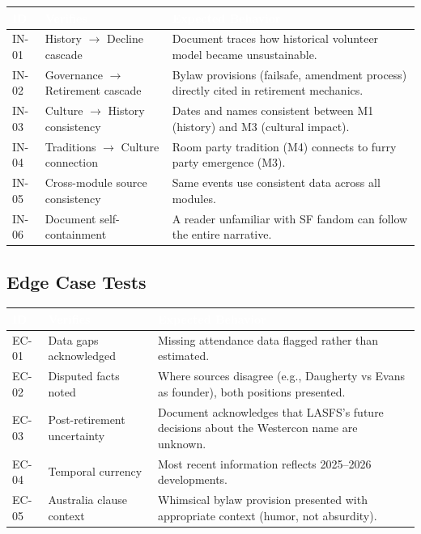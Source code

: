 \documentclass[11pt,letterpaper]{article}
\newcommand{\tableheader}[1]{\textbf{\sffamily\textcolor{white}{#1}}}
\begin{document}
\begin{center}
\begin{tabularx}{\textwidth}{C{1.2cm}L{3cm}X}
\toprule
{}
\tableheader{ID} & \tableheader{Verifies} & \tableheader{Expected Behavior} \\
\midrule
IN-01 & History $\rightarrow$ Decline cascade & Document traces how historical volunteer model became unsustainable. \\
IN-02 & Governance $\rightarrow$ Retirement cascade & Bylaw provisions (failsafe, amendment process) directly cited in retirement mechanics. \\
IN-03 & Culture $\rightarrow$ History consistency & Dates and names consistent between M1 (history) and M3 (cultural impact). \\
IN-04 & Traditions $\rightarrow$ Culture connection & Room party tradition (M4) connects to furry party emergence (M3). \\
IN-05 & Cross-module source consistency & Same events use consistent data across all modules. \\
IN-06 & Document self-containment & A reader unfamiliar with SF fandom can follow the entire narrative. \\
\bottomrule
\end{tabularx}
\end{center}

\subsection{Edge Case Tests}

\begin{center}
\begin{tabularx}{\textwidth}{C{1.2cm}L{3cm}X}
\toprule
{}
\tableheader{ID} & \tableheader{Verifies} & \tableheader{Expected Behavior} \\
\midrule
EC-01 & Data gaps acknowledged & Missing attendance data flagged rather than estimated. \\
EC-02 & Disputed facts noted & Where sources disagree (e.g., Daugherty vs Evans as founder), both positions presented. \\
EC-03 & Post-retirement uncertainty & Document acknowledges that LASFS's future decisions about the Westercon name are unknown. \\
EC-04 & Temporal currency & Most recent information reflects 2025--2026 developments. \\
EC-05 & Australia clause context & Whimsical bylaw provision presented with appropriate context (humor, not absurdity). \\
\bottomrule
\end{tabularx}
\end{center}
\end{document}
